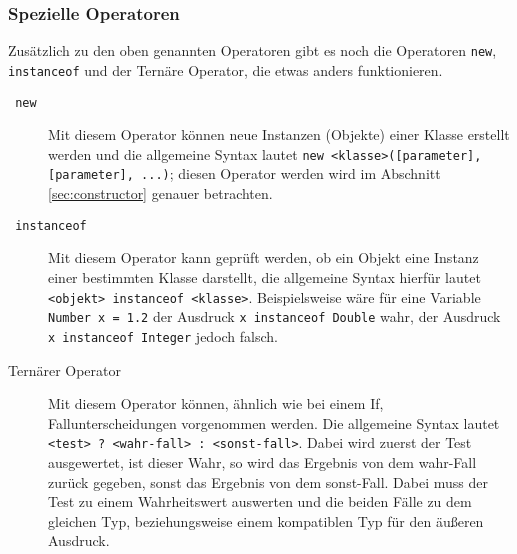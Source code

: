 	\subsubsection{Spezielle Operatoren}
		Zusätzlich zu den oben genannten Operatoren gibt es noch die Operatoren \lstinline|new|, \lstinline|instanceof| und der Ternäre Operator, die etwas anders funktionieren.
		\begin{description}
			\item[\texttt{\color{lstkeywords} new}] Mit diesem Operator können neue Instanzen (Objekte) einer Klasse erstellt werden und die allgemeine Syntax lautet \lstinline|new <klasse>([parameter], [parameter], ...)|; diesen Operator werden wird im Abschnitt \ref{sec:constructor} genauer betrachten.
			\item[\texttt{\color{lstkeywords} instanceof}] Mit diesem Operator kann geprüft werden, ob ein Objekt eine Instanz einer bestimmten Klasse darstellt, die allgemeine Syntax hierfür lautet \lstinline|<objekt> instanceof <klasse>|. Beispielsweise wäre für eine Variable \lstinline|Number x = 1.2| der Ausdruck \lstinline|x instanceof Double| wahr, der Ausdruck \lstinline|x instanceof Integer| jedoch falsch.
			\item[Ternärer Operator] Mit diesem Operator können, ähnlich wie bei einem If, Fallunterscheidungen vorgenommen werden. Die allgemeine Syntax lautet \lstinline|<test> ? <wahr-fall> : <sonst-fall>|. Dabei wird zuerst der Test ausgewertet, ist dieser Wahr, so wird das Ergebnis von dem wahr-Fall zurück gegeben, sonst das Ergebnis von dem sonst-Fall. Dabei muss der Test zu einem Wahrheitswert auswerten und die beiden Fälle zu dem gleichen Typ, beziehungsweise einem kompatiblen Typ für den äußeren Ausdruck.
		\end{description}
	
